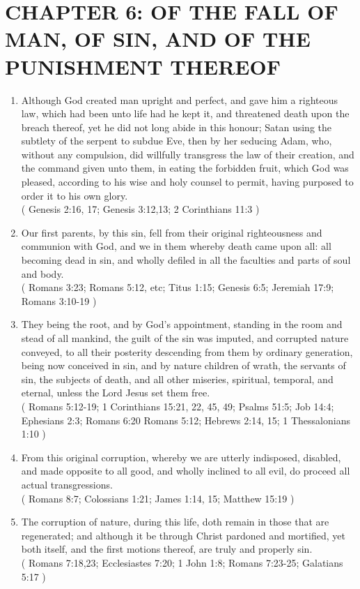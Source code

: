 \documentclass[12pt,a4paper]{book}
\begin{document}
\chapter{CHAPTER 6: OF THE FALL OF MAN, OF SIN, AND OF THE PUNISHMENT THEREOF}
\label{ch-fall}
\begin{enumerate}
\item Although God created man upright and perfect, and gave him a righteous law, which had been unto life had he kept it, and threatened death upon the breach thereof, yet he did not long abide in this honour; Satan using the subtlety of the serpent to subdue Eve, then by her seducing Adam, who, without any compulsion, did willfully transgress the law of their creation, and the command given unto them, in eating the forbidden fruit, which God was pleased, according to his wise and holy counsel to permit, having purposed to order it to his own glory.\\
( Genesis 2:16, 17; Genesis 3:12,13; 2 Corinthians 11:3 )
\item Our first parents, by this sin, fell from their original righteousness and communion with God, and we in them whereby death came upon all: all becoming dead in sin, and wholly defiled in all the faculties and parts of soul and body.\\
( Romans 3:23; Romans 5:12, etc; Titus 1:15; Genesis 6:5; Jeremiah 17:9; Romans 3:10-19 )
\item They being the root, and by God's appointment, standing in the room and stead of all mankind, the guilt of the sin was imputed, and corrupted nature conveyed, to all their posterity descending from them by ordinary generation, being now conceived in sin, and by nature children of wrath, the servants of sin, the subjects of death, and all other miseries, spiritual, temporal, and eternal, unless the Lord Jesus set them free.\\
( Romans 5:12-19; 1 Corinthians 15:21, 22, 45, 49; Psalms 51:5; Job 14:4; Ephesians 2:3; Romans 6:20 Romans 5:12; Hebrews 2:14, 15; 1 Thessalonians 1:10 )
\item From this original corruption, whereby we are utterly indisposed, disabled, and made opposite to all good, and wholly inclined to all evil, do proceed all actual transgressions.\\
( Romans 8:7; Colossians 1:21; James 1:14, 15; Matthew 15:19 )
\item The corruption of nature, during this life, doth remain in those that are regenerated; and although it be through Christ pardoned and mortified, yet both itself, and the first motions thereof, are truly and properly sin.\\
( Romans 7:18,23; Ecclesiastes 7:20; 1 John 1:8; Romans 7:23-25; Galatians 5:17 )
\end{enumerate}
\end{document}
